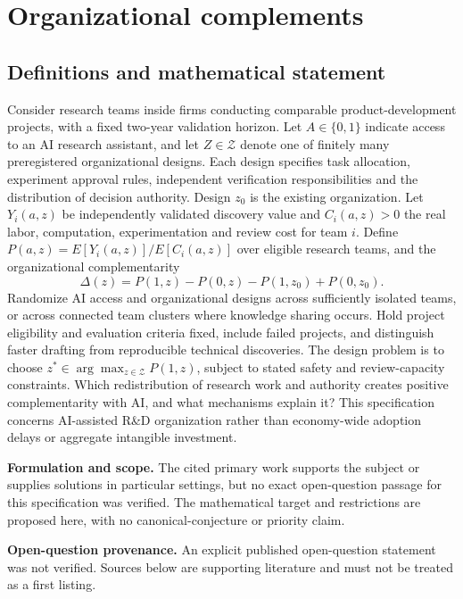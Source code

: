 \documentclass[11pt]{article}
\begin{document}
\section*{Organizational complements}\label{30007696}
\subsection{Definitions and mathematical statement}
Consider research teams inside firms conducting comparable product-development projects, with a fixed two-year validation horizon. Let \(A\in\{0,1\}\) indicate access to an AI research assistant, and let \(Z\in\mathcal Z\) denote one of finitely many preregistered organizational designs. Each design specifies task allocation, experiment approval rules, independent verification responsibilities and the distribution of decision authority. Design \(z_0\) is the existing organization. Let \(Y_i(a,z)\) be independently validated discovery value and \(C_i(a,z)>0\) the real labor, computation, experimentation and review cost for team \(i\). Define \(P(a,z)=E[Y_i(a,z)]/E[C_i(a,z)]\) over eligible research teams, and the organizational complementarity
\[
\Delta(z)=P(1,z)-P(0,z)-P(1,z_0)+P(0,z_0).
\]
Randomize AI access and organizational designs across sufficiently isolated teams, or across connected team clusters where knowledge sharing occurs. Hold project eligibility and evaluation criteria fixed, include failed projects, and distinguish faster drafting from reproducible technical discoveries. The design problem is to choose \(z^\ast\in\arg\max_{z\in\mathcal Z}P(1,z)\), subject to stated safety and review-capacity constraints. Which redistribution of research work and authority creates positive complementarity with AI, and what mechanisms explain it? This specification concerns AI-assisted R\&D organization rather than economy-wide adoption delays or aggregate intangible investment.

\par\textbf{Formulation and scope.} The cited primary work supports the subject or supplies solutions in particular settings, but no exact open-question passage for this specification was verified. The mathematical target and restrictions are proposed here, with no canonical-conjecture or priority claim.

\par\textbf{Open-question provenance.} An explicit published open-question statement was not verified. Sources below are supporting literature and must not be treated as a first listing.
\end{document}
